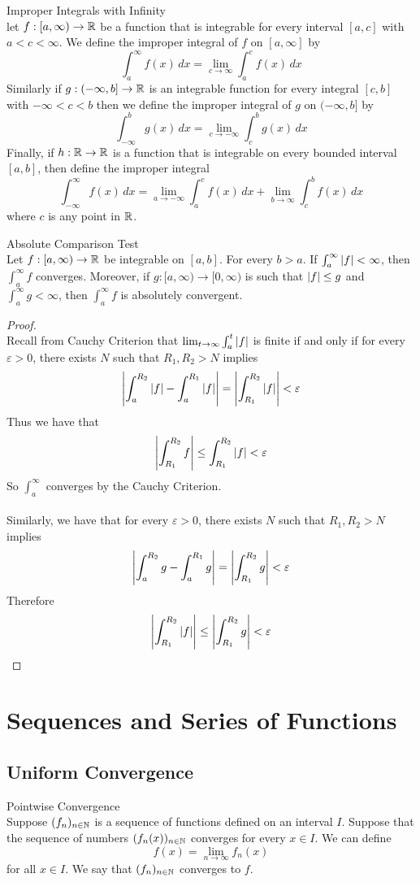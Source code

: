 \documentclass[a4paper]{article}
\begin{document}
\begin{defn}{Improper Integrals with Infinity}{}\\ let $f:[a,\infty)\to\mathbb{R}$ be a function that is integrable for every interval $[a,c]$ with $a<c<\infty$. We define the improper integral of $f$ on $[a,\infty]$ by $$\int_{a}^{\infty}f(x)\,dx=\lim_{c\to\infty}\int_{a}^{c}f(x)\,dx$$
Similarly if $g:(-\infty,b]\to\mathbb{R}$ is an integrable function for every integral $[c,b]$ with $-\infty<c<b$ then we define the improper integral of $g$ on $(-\infty,b]$ by $$\int_{-\infty}^{b}g(x)\,dx=\lim_{c\to-\infty}\int_{c}^{b}g(x)\,dx$$
Finally, if $h:\mathbb{R}\to\mathbb{R}$ is a function that is integrable on every bounded interval $[a,b]$, then define the improper integral $$\int_{-\infty}^\infty f(x)\,dx=\lim_{a\to-\infty}\int_a^cf(x)\,dx+\lim_{b\to\infty}\int_c^bf(x)\,dx$$ where $c$ is any point in $\mathbb{R}$. 
\end{defn}

\begin{thm}{Absolute Comparison Test}{}\\ Let $f:[a,\infty)\to\mathbb{R}$ be integrable on $[a,b]$. For every $b>a$. If $\int_a^\infty\abs{f}<\infty$, then $\int_a^\infty f$ converges. Moreover, if $g:[a,\infty)\to[0,\infty)$ is such that $\abs{f}\leq g$ and $\int_a^\infty g<\infty$, then $\int_a^\infty f$ is absolutely convergent. 
\begin{proof}\\ Recall from Cauchy Criterion that $\lim_{t\to\infty}\int_a^t\abs{f}$ is finite if and only if for every $\varepsilon>0$, there exists $N$ such that $R_1,R_2>N$ implies $$\abs{\int_a^{R_2}\abs{f}-\int_a^{R_1}\abs{f}}=\abs{\int_{R_1}^{R_2}\abs{f}}<\varepsilon$$ Thus we have that $$\abs{\int_{R_1}^{R_2}f}\leq\int_{R_1}^{R_2}\abs{f}<\varepsilon$$ So $\int_a^\infty$ converges by the Cauchy Criterion. \\~\\
Similarly, we have that for every $\varepsilon>0$, there exists $N$ such that $R_1,R_2>N$ implies $$\abs{\int_a^{R_2}g-\int_a^{R_1}g}=\abs{\int_{R_1}^{R_2}g}<\varepsilon$$ Therefore $$\abs{\int_{R_1}^{R_2}\abs{f}}\leq\abs{\int_{R_1}^{R_2}g}<\varepsilon$$
\end{proof}
\end{thm}

\pagebreak
\section{Sequences and Series of Functions}
\subsection{Uniform Convergence}
\begin{defn}{Pointwise Convergence}{}\\ Suppose $(f_n)_{n\in\mathbb{N}}$ is a sequence of functions defined on an interval $I$. Suppose that the sequence of numbers $(f_n(x))_{n\in\mathbb{N}}$ converges for every $x\in I$. We can define $$f(x)=\lim_{n\to\infty}f_n(x)$$ for all $x\in I$. We say that $(f_n)_{n\in\mathbb{N}}$ converges to $f$. 
\end{defn}
\end{document}
